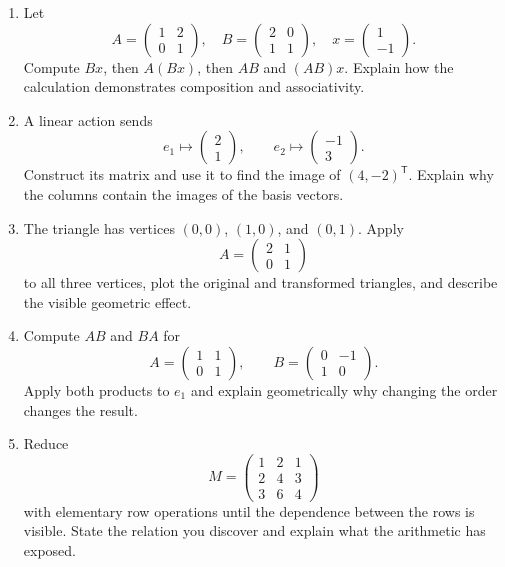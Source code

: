 \begin{enumerate}
\item Let
\[
A=\begin{pmatrix}1&2\\0&1\end{pmatrix},
\quad
B=\begin{pmatrix}2&0\\1&1\end{pmatrix},
\quad
x=\begin{pmatrix}1\\-1\end{pmatrix}.
\]
Compute $Bx$, then $A(Bx)$, then $AB$ and $(AB)x$. Explain how the calculation demonstrates composition and associativity.

\item A linear action sends
\[
e_1\mapsto\begin{pmatrix}2\\1\end{pmatrix},
\qquad
e_2\mapsto\begin{pmatrix}-1\\3\end{pmatrix}.
\]
Construct its matrix and use it to find the image of $(4,-2)^{\mathsf T}$. Explain why the columns contain the images of the basis vectors.

\item The triangle has vertices $(0,0)$, $(1,0)$, and $(0,1)$. Apply
\[
A=\begin{pmatrix}2&1\\0&1\end{pmatrix}
\]
to all three vertices, plot the original and transformed triangles, and describe the visible geometric effect.

\item Compute $AB$ and $BA$ for
\[
A=\begin{pmatrix}1&1\\0&1\end{pmatrix},
\qquad
B=\begin{pmatrix}0&-1\\1&0\end{pmatrix}.
\]
Apply both products to $e_1$ and explain geometrically why changing the order changes the result.

\item Reduce
\[
M=\begin{pmatrix}1&2&1\\2&4&3\\3&6&4\end{pmatrix}
\]
with elementary row operations until the dependence between the rows is visible. State the relation you discover and explain what the arithmetic has exposed.


\end{enumerate}
